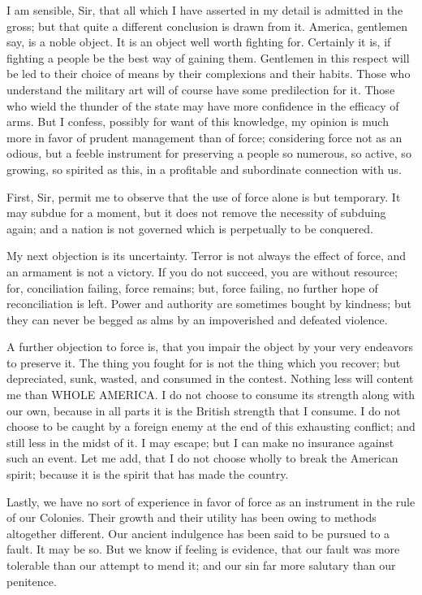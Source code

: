 I am sensible, Sir, that all which I have asserted in my detail is admitted in the gross; but that quite a different conclusion is drawn from it. America, gentlemen say, is a noble object. It is an object well worth fighting for. Certainly it is, if fighting a people be the best way of gaining them. Gentlemen in this respect will be led to their choice of means by their complexions and their habits. Those who understand the military art will of course have some predilection for it. Those who wield the thunder of the state may have more confidence in the efficacy of arms. But I confess, possibly for want of this knowledge, my opinion is much more in favor of prudent management than of force; considering force not as an odious, but a feeble instrument for preserving a people so numerous, so active, so growing, so spirited as this, in a profitable and subordinate connection with us.\par

First, Sir, permit me to observe that the use of force alone is but temporary. It may subdue for a moment, but it does not remove the necessity of subduing again; and a nation is not governed which is perpetually to be conquered.\par

My next objection is its uncertainty. Terror is not always the effect of force, and an armament is not a victory. If you do not succeed, you are without resource; for, conciliation failing, force remains; but, force failing, no further hope of reconciliation is left. Power and authority are sometimes bought by kindness; but they can never be begged as alms by an impoverished and defeated violence.\par

A further objection to force is, that you impair the object by your very endeavors to preserve it. The thing you fought for is not the thing which you recover; but depreciated, sunk, wasted, and consumed in the contest. Nothing less will content me than WHOLE AMERICA. I do not choose to consume its strength along with our own, because in all parts it is the British strength that I consume. I do not choose to be caught by a foreign enemy at the end of this exhausting conflict; and still less in the midst of it. I may escape; but I can make no insurance against such an event. Let me add, that I do not choose wholly to break the American spirit; because it is the spirit that has made the country.\par

Lastly, we have no sort of experience in favor of force as an instrument in the rule of our Colonies. Their growth and their utility has been owing to methods altogether different. Our ancient indulgence has been said to be pursued to a fault. It may be so. But we know if feeling is evidence, that our fault was more tolerable than our attempt to mend it; and our sin far more salutary than our penitence.\par

